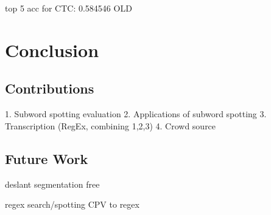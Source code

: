 \documentclass[ms,electronic,twosidetoc,letterpaper,chaptercenter,parttop,lol,lof,lot]{byumsphd}
\begin{document}
top 5 acc for CTC: 0.584546 OLD






\chapter{Conclusion}

\section{Contributions}

1. Subword spotting evaluation
2. Applications of subword spotting
3. Transcription (RegEx, combining 1,2,3)
4. Crowd source

\section{Future Work}

deslant
segmentation free

regex search/spotting
CPV to regex




\end{document}
